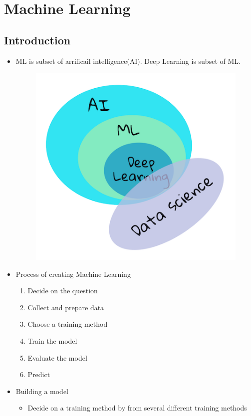 \documentclass[a4paper,12pt]{ltjsreport}
\begin{document}
\section*{Machine Learning}
\subsection*{Introduction}
\begin{itemize}
  \item ML is subset of arrificail intelligence(AI). Deep Learning is subset of ML.
        \begin{figure}[H]
          \centering
          \includegraphics[keepaspectratio,scale=1]{ai-ml-ds.png}
        \end{figure}
  \item Process of creating Machine Learning
        \begin{enumerate}
          \item Decide on the question
          \item Collect and prepare data
          \item Choose a training method
          \item Train the model
          \item Evaluate the model
          \item Predict
        \end{enumerate}
  \item Building a model
        \begin{itemize}
          \item Decide on a training method by from several different training methods

\end{itemize}
\end{itemize}
\end{document}
